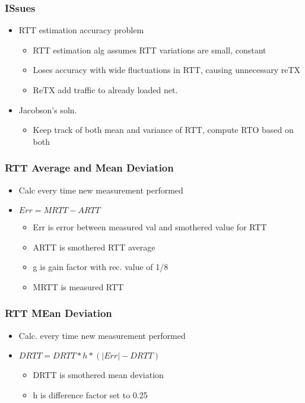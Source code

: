 \documentclass[a4paper]{article}
\begin{document}
\subsubsection{ISsues}
\begin{itemize}
	\item RTT estimation accuracy problem
	\begin{itemize}
		\item RTT estimation alg assumes RTT variations are small,
			constant
		\item Loses accuracy with wide fluctuations in RTT, causing
			unnecessary reTX
		\item ReTX add traffic to already loaded net.
	\end{itemize}
	\item Jacobson's soln.
	\begin{itemize}
		\item Keep track of both mean and variance of RTT, compute RTO
			based on both
	\end{itemize}
\end{itemize}
\subsubsection{RTT Average and Mean Deviation}
\begin{itemize}
	\item Calc every time new measurement performed
	\item $Err = MRTT - ARTT$
	\begin{itemize}
		\item Err is error between measured val and smothered value for
			RTT
		\item ARTT is smothered RTT average
		\item g is gain factor with rec. value of 1/8
		\item MRTT is measured RTT
	\end{itemize}
\end{itemize}
\subsubsection{RTT MEan Deviation}
\begin{itemize}
	\item Calc. every time new measurement performed
	\item $DRTT = DRTT*h*(|Err|-DRTT)$
	\begin{itemize}
		\item DRTT is smothered mean deviation
		\item h is difference factor set to 0.25
	\end{itemize}
\end{itemize}
\end{document}
